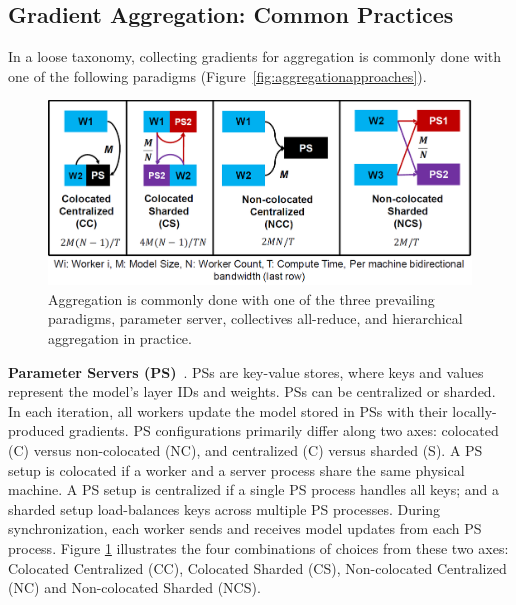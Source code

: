 \subsection{Gradient Aggregation: Common Practices}
In a loose taxonomy, collecting gradients for aggregation is commonly done with one of the following paradigms (Figure~\ref{fig:aggregationapproaches}).


\begin{figure}[t!]
	\centering
	\includegraphics[width=.7\linewidth, trim=2 3 3 3,clip]{Figures/pssetups.PNG}
	\caption{Aggregation is commonly done with one of the three prevailing paradigms, parameter server, collectives all-reduce, and hierarchical aggregation in practice.}
	\label{fig:pssetups}
\end{figure}

\noindent\textbf{Parameter Servers (PS)}~\cite{ps0,ps1,ps2,ps3, phubsocc, phubsysml, poseidon,cui2016geeps}. %
PSs are key-value stores, where keys and values represent the model's layer IDs and weights. PSs can be centralized or sharded. In each iteration, all workers update the model stored in PSs with their locally-produced gradients. PS configurations primarily differ along two axes: colocated (C) versus non-colocated (NC), and centralized (C) versus sharded (S). %
A PS setup is colocated if a worker and a server process share the same physical machine. A PS setup is centralized if a single PS process handles all keys; and a sharded setup load-balances keys across multiple PS processes.
During synchronization, each worker sends and receives model updates from each PS process. Figure \ref{fig:pssetups} illustrates the four combinations of choices from these two axes: Colocated Centralized (CC), Colocated Sharded (CS), Non-colocated Centralized (NC) and Non-colocated Sharded (NCS).

